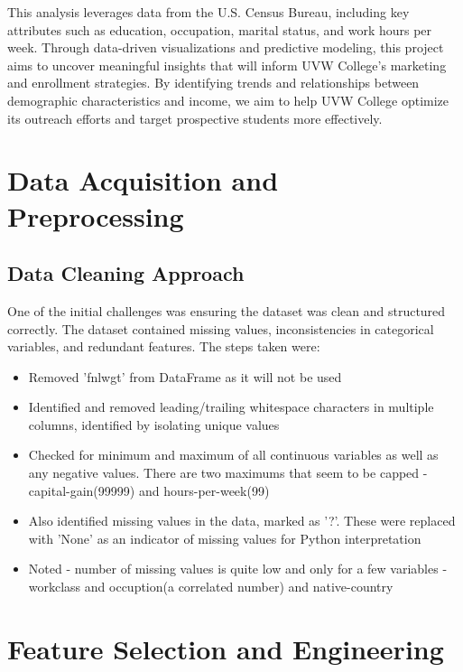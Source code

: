 \documentclass[journal,onecolumn]{IEEEtran}
\begin{document}
This analysis leverages data from the U.S. Census Bureau, including key attributes
such as education, occupation, marital status, and work hours per week. Through
data-driven visualizations and predictive modeling, this project aims to uncover
meaningful insights that will inform UVW College’s marketing and enrollment strategies.
By identifying trends and relationships between demographic characteristics and income,
we aim to help UVW College optimize its outreach efforts and target prospective
students more effectively.



\section{Data Acquisition and Preprocessing}


\subsection{Data Cleaning Approach}
One of the initial challenges was ensuring the dataset was clean and structured correctly. The dataset contained missing values, inconsistencies in categorical variables, and redundant features. The steps taken were:
\begin{itemize}
    \item Removed 'fnlwgt' from DataFrame as it will not be used
    \item Identified and removed leading/trailing whitespace characters in multiple columns, identified by isolating unique values
    \item Checked for minimum and maximum of all continuous variables as well as any negative values. There are two maximums that seem to be capped - capital-gain(99999) and hours-per-week(99)
    \item Also identified missing values in the data, marked as '?'. These were replaced with 'None' as an indicator of missing values for Python interpretation
    \item Noted - number of missing values is quite low and only for a few variables - workclass and occuption(a correlated number) and native-country
\end{itemize}

\section{Feature Selection and Engineering}
\end{document}
